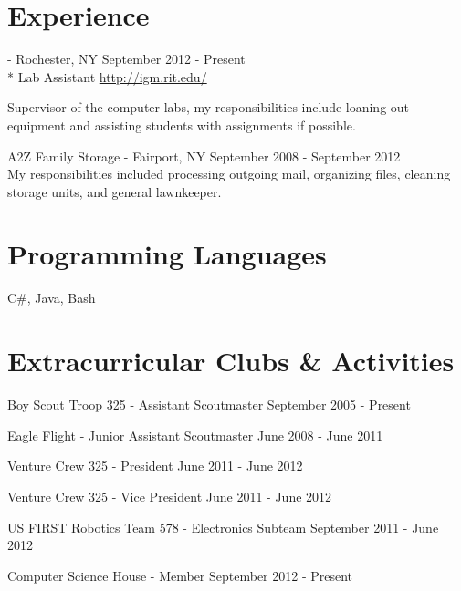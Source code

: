 \documentclass[letterpaper,margin,line,11pt]{resume}
\newcommand{\rurl}[1]{\hfill {\footnotesize \url{#1}}}
\newcommand{\rdate}[1]{\hfill {\small #1}}
\renewcommand{\employer}[5]{\item[#1] - #2 \rdate{#3} \\* #4 \rurl{#5}}
\begin{document}
\begin{resume}
\section{\mysidestyle Experience}
	\begin{asparadesc}
		\employer{Interactive Games and Media at RIT}{Rochester, NY}{September 2012 - Present}{Lab Assistant}{http://igm.rit.edu/}

		\small
		Supervisor of the computer labs, my responsibilities include loaning out equipment and assisting students with assignments if possible.
		\normalsize
		\\
		\item[A2Z Family Storage] - Fairport, NY \hfill September 2008 - September 2012 \\
		\small
                My responsibilities included processing outgoing mail, organizing files, cleaning storage units, and general lawnkeeper.
		

	\end{asparadesc}

\section{\mysidestyle Programming Languages}
	\begin{compactdesc}
		\item C\#, Java, Bash \\
	\end{compactdesc}

\section{\mysidestyle Extracurricular Clubs \& Activities}
	\begin{asparablank}
		\item Boy Scout Troop 325 - {\small Assistant Scoutmaster} \hfill September 2005 - Present
		\item Eagle Flight - {\small Junior Assistant Scoutmaster} \hfill June 2008 - June 2011
		\item Venture Crew 325 - {\small President} \hfill June 2011 - June 2012
		\item Venture Crew 325 - {\small Vice President} \hfill June 2011 - June 2012
		\item US FIRST Robotics Team 578 - {\small Electronics Subteam} \hfill September 2011 - June 2012
		\item Computer Science House - Member \hfill September 2012 - Present
	\end{asparablank}


\end{resume}
\end{document}
